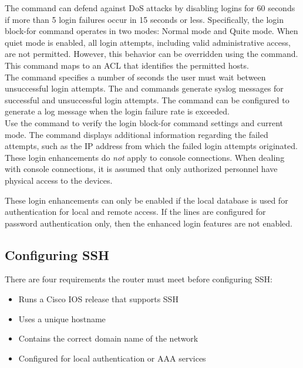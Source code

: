 The  command can defend against DoS attacks by disabling logins for 60 seconds if more than 5 login failures occur in 15 seconds or less. Specifically, the login block-for command operates in two modes: Normal mode and Quite mode. When quiet mode is enabled, all login attempts, including valid administrative access, are not permitted. However, this behavior can be overridden using the  command. This command maps to an ACL that identifies the permitted hosts. \\

The  command specifies a number of seconds the user must wait between unsuccessful login attempts. The  and  commands generate syslog messages for successful and unsuccessful login attempts. The  command can be configured to generate a log message when the login failure rate is exceeded.\\

Use the  command to verify the login block-for command settings and current mode. The  command displays additional information regarding the failed attempts, such as the IP address from which the failed login attempts originated.\\

These login enhancements do \emph{not} apply to console connections. When dealing with console connections, it is assumed that only authorized personnel have physical access to the devices.

\note These login enhancements can only be enabled if the local database is used for authentication for local and remote access. If the lines are configured for password authentication only, then the enhanced login features are not enabled.

\subsection{Configuring SSH}

There are four requirements the router must meet before configuring SSH:

\begin{itemize}
\item Runs a Cisco IOS release that supports SSH
\item Uses a unique hostname
\item Contains the correct domain name of the network
\item Configured for local authentication or AAA services
\end{itemize}

